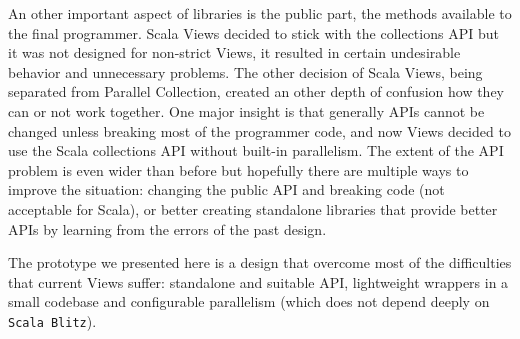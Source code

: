 \documentclass[a4paper,12pt,twocolumn]{article}
\begin{document}
An other important aspect of libraries is the public part, the methods available to the final programmer.
Scala Views decided to stick with the collections API but it was not designed for non-strict Views, it resulted in certain undesirable behavior and unnecessary problems.
The other decision of Scala Views, being separated from Parallel Collection, created an other depth of confusion how they can or not work together.
One major insight is that generally APIs cannot be changed unless breaking most of the programmer code, and now Views decided to use the Scala collections API without built-in parallelism.
The extent of the API problem is even wider than before but hopefully there are multiple ways to improve the situation: changing the public API and breaking code (not acceptable for Scala), or better creating standalone libraries that provide better APIs by learning from the errors of the past design.

The prototype we presented here is a design that overcome most of the difficulties that current Views suffer: standalone and suitable API, lightweight wrappers in a small codebase and configurable parallelism (which does not depend deeply on \verb|Scala Blitz|).


{}

\end{document}
